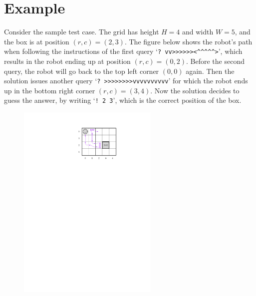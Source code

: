 \section*{Example}

Consider the sample test case. The grid has height $H = 4$ and width $W = 5$, and the box is at position $(r,c) = (2,3)$. 
The figure below shows the robot's path when following the instructions of the first query `\verb!? vv>>>>>><^^^^^>!', 
which results in the robot ending up at position $(r,c) = (0,2)$. 
Before the second query, the robot will go back to the top left corner $(0,0)$ again. Then the solution issues another query
`\verb!? >>>>>>>>vvvvvvvvvv!' for which the robot ends up in the bottom right corner $(r,c) = (3,4)$. 
Now the solution decides to guess the answer, by writing `\verb|! 2 3|', which is the correct position of the box.

\begin{figure}[h]
  \centering
  \includegraphics[width=0.6\textwidth]{sample_illustration}
\end{figure}
